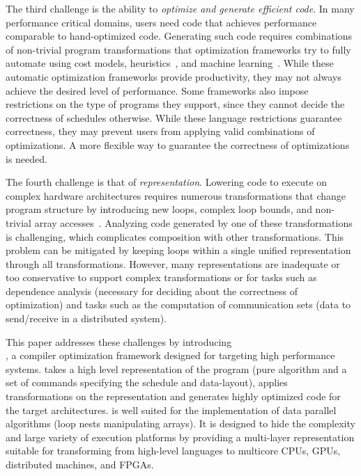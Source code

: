 The third challenge is the ability to \emph{optimize and generate efficient code}.  In many performance critical domains, users need code that achieves performance comparable to hand-optimized code.  
Generating such code requires combinations of non-trivial program transformations that optimization frameworks try to fully automate using cost models, heuristics~\cite{hall1995detecting}, and machine learning~\cite{tournavitis2009towards}.
While these automatic optimization frameworks provide productivity, they may not always achieve the desired level of performance.
Some frameworks also impose restrictions on the type of programs they support, since they cannot decide the correctness of schedules otherwise. While these language restrictions guarantee correctness, they may prevent users from applying valid combinations of optimizations. A more flexible way to guarantee the correctness of optimizations is needed.

The fourth challenge is that of \emph{representation}.  Lowering code to execute on complex hardware architectures requires numerous transformations that change program structure by introducing new loops, complex loop bounds, and non-trivial array accesses~\cite{wolf1991loop}.  Analyzing code generated by one of these transformations is challenging, which complicates composition with other transformations.  This problem can be mitigated by keeping loops within a single unified representation through all transformations.  However, many representations are inadequate or too conservative to support complex transformations or for tasks such as dependence analysis (necessary for deciding about the correctness of optimization) and tasks such as the computation of communication sets (data to send/receive in a distributed system).  

This paper addresses these challenges by introducing \\\framework{}, a compiler optimization framework designed for targeting high performance systems.  \framework{} takes a high level representation of the program (pure algorithm and a set of commands specifying the schedule and data-layout), applies transformations on the representation and generates highly optimized code for the target architectures.  \framework{} is well suited for the implementation of data parallel algorithms (loop nests manipulating arrays).  It is designed to hide the complexity and large variety of execution platforms by providing a multi-layer representation suitable for transforming from high-level languages to multicore CPUs, GPUs, distributed machines, and FPGAs.

